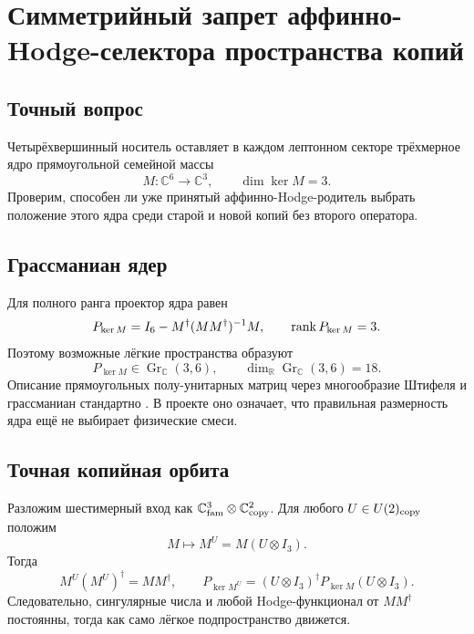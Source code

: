 \chapter{Симметрийный запрет аффинно-Hodge-селектора пространства копий}
\label{ch:v7-affine-hodge-copy-selector-no-go-gate}

\section{Точный вопрос}

Четырёхвершинный носитель оставляет в каждом лептонном секторе трёхмерное
ядро прямоугольной семейной массы
\begin{equation}
 M:\mathbb C^6\longrightarrow\mathbb C^3,
 \qquad \dim\ker M=3.
 \label{eq:v7-copy-selector-rectangular-mass}
\end{equation}
Проверим, способен ли уже принятый аффинно-Hodge-родитель выбрать положение
этого ядра среди старой и новой копий без второго оператора.

\section{Грассманиан ядер}

Для полного ранга проектор ядра равен
\begin{equation}
 P_{\ker M}=I_6-M^\dagger(MM^\dagger)^{-1}M,
 \qquad \operatorname{rank} P_{\ker M}=3.
 \label{eq:v7-copy-selector-kernel-projector}
\end{equation}
Поэтому возможные лёгкие пространства образуют
\begin{equation}
 P_{\ker M}\in\operatorname{Gr}_{\mathbb C}(3,6),
 \qquad
 \dim_{\mathbb R}\operatorname{Gr}_{\mathbb C}(3,6)=18.
 \label{eq:v7-copy-selector-grassmannian}
\end{equation}
Описание прямоугольных полу-унитарных матриц через многообразие Штифеля и
грассманиан стандартно \cite{v7copy-grassmann}. В проекте оно означает, что
правильная размерность ядра ещё не выбирает физические смеси.

\section{Точная копийная орбита}

Разложим шестимерный вход как
$\mathbb C^3_{\rm fam}\otimes\mathbb C^2_{\rm copy}$. Для любого
$U\in U(2)_{\rm copy}$ положим
\begin{equation}
 M\longmapsto M^U=M(U\otimes I_3).
 \label{eq:v7-copy-selector-orbit}
\end{equation}
Тогда
\begin{equation}
 M^U(M^U)^\dagger=MM^\dagger,
 \qquad
 P_{\ker M^U}=(U\otimes I_3)^\dagger
 P_{\ker M}(U\otimes I_3).
 \label{eq:v7-copy-selector-invariant-gram-moving-kernel}
\end{equation}
Следовательно, сингулярные числа и любой Hodge-функционал от
$MM^\dagger$ постоянны, тогда как само лёгкое подпространство движется.

